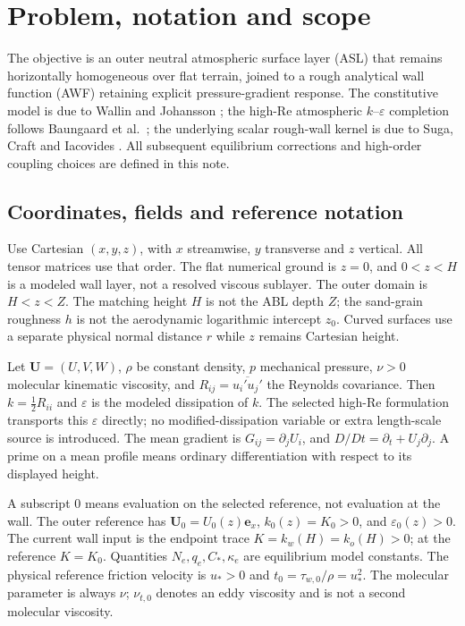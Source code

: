 \documentclass[11pt,a4paper]{article}
\numberwithin{equation}{section}
\newcommand{\eps}{\varepsilon}
\begin{document}
\clearpage
{\small\setlength{\parskip}{0pt}\tableofcontents}
\newpage

\section{Problem, notation and scope}
\label{sec:scope}
The objective is an outer neutral atmospheric surface layer (ASL) that
remains horizontally homogeneous over flat terrain, joined to a rough
analytical wall function (AWF) retaining explicit pressure-gradient
response. The constitutive model is due to Wallin and Johansson
\cite{WJ2000}; the high-Re atmospheric $k$--$\eps$ completion follows
Baungaard et al.\ \cite{Baungaard2022}; the underlying scalar rough-wall
kernel is due to Suga, Craft and Iacovides \cite{SCI2006}.
All subsequent equilibrium corrections and high-order coupling choices
are defined in this note.

\subsection{Coordinates, fields and reference notation}
Use Cartesian $(x,y,z)$, with $x$ streamwise, $y$ transverse and $z$
vertical. All tensor matrices use that order. The flat numerical ground
is $z=0$, and $0<z<H$ is a modeled wall layer, not a resolved viscous
sublayer. The outer domain is $H<z<Z$. The matching height $H$ is not
the ABL depth $Z$; the sand-grain roughness $h$ is not the aerodynamic
logarithmic intercept $z_0$. Curved surfaces use a separate physical
normal distance $r$ while $z$ remains Cartesian height.

Let $\bm U=(U,V,W)$, $\rho$ be constant density, $p$ mechanical pressure,
$\nu>0$ molecular kinematic viscosity, and
$R_{ij}=\overline{u_i'u_j'}$ the Reynolds covariance. Then
$k=\tfrac12R_{ii}$ and $\eps$ is the modeled dissipation of $k$.
The selected high-Re formulation transports this $\eps$ directly;
no modified-dissipation variable or extra length-scale source is
introduced. The mean gradient is $G_{ij}=\partial_jU_i$, and
$D/Dt=\partial_t+U_j\partial_j$. A prime on a mean profile means
ordinary differentiation with respect to its displayed height.

A subscript $0$ means evaluation on the selected reference, not
evaluation at the wall. The outer reference has
$\bm U_0=U_0(z)\bm e_x$, $k_0(z)=K_0>0$, and $\eps_0(z)>0$.
The current wall input is the endpoint trace
$K=k_w(H)=k_o(H)>0$; at the reference $K=K_0$.
Quantities $N_e,q_e,C_*,\kappa_e$ are equilibrium model constants.
The physical reference friction velocity is $u_*>0$ and
$t_0=\tau_{w,0}/\rho=u_*^2$.
The molecular parameter is always $\nu$; $\nu_{t,0}$ denotes an
eddy viscosity and is not a second molecular viscosity.
\end{document}
